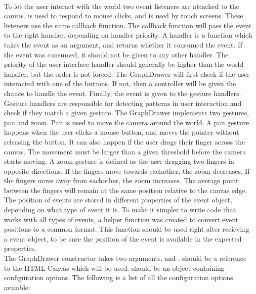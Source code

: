 \\[11pt]
To let the user interact with the world two event listeners are attached to the canvas.  is used to respond to mouse clicks, and  is used by touch screens. These listeners use the same callback function. The callback function will pass the event to the right handler, depending on handler priority. A handler is a function which takes the event as an argument, and returns whether it consumed the event. If the event was consumed, it should not be given to any other handler. The priority of the user interface handler should generally be higher than the world handler, but the order is not forced. The GraphDrawer will first check if the user interacted with one of the buttons. If not, then a controller will be given the chance to handle the event. Finally, the event is given to the gesture handlers. Gesture handlers are responsible for detecting patterns in user interaction and check if they match a given gesture. The GraphDrawer implements two gestures, pan and zoom. Pan is used to move the camera around the world. A pan gesture happens when the user clicks a mouse button, and moves the pointer without releasing the button. It can also happen if the user drags their finger across the canvas. The movement must be larger than a given threshold before the camera starts moving. A zoom gesture is defined as the user dragging two fingers in opposite directions. If the fingers move towards eachother, the zoom decreases. If the fingers move away from eachother, the zoom increases. The average point between the fingers will remain at the same position relative to the canvas edge. The position of events are stored in different properties of the event object, depending on what type of event it is. To make it simpler to write code that works with all types of events, a helper function  was created to convert event positions to a common format. This function should be used right after recieving a event object, to be sure the position of the event is available in the expected properties.
\\[11pt]
The GraphDrawer constructor takes two arguments,  and .  should be a reference to the HTML Canvas which will be used.  should be an object containing configuration options. The following is a list of all the configuration options avaiable:
